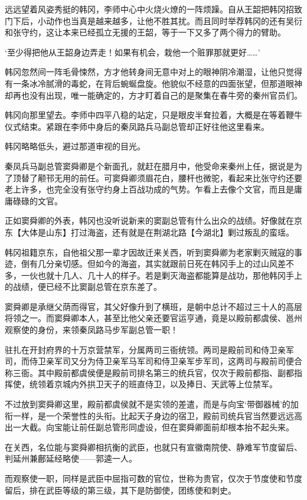 远远望着风姿秀挺的韩冈，李师中心中火烧火燎的一阵烦躁。自从王韶把韩冈招致门下后，小动作也当真是越来越多，让他不胜其扰。而且同时举荐韩冈的还有吴衍和张守约，这让本来已经孤立无援的王韶，等于一下又多了两个得力的臂助。

‘至少得把他从王韶身边弄走！如果有机会，栽他一个赃罪那就更好……’

韩冈忽然间一阵毛骨悚然，方才他转身间无意中对上的眼神阴冷潮湿，让他只觉得有一条冰冷腻滑的毒蛇，在背后蜿蜒盘旋。他貌似不经意的四面张望，但那道眼神却再也没有出现，唯一能确定的，方才盯着自己的是聚集在春牛旁的秦州官员们。

韩冈向那里望去。李师中四平八稳的站定，只是眼皮半耷拉着，大概是在等着鞭牛仪式结束。紧跟在李师中身后的秦凤路兵马副总管却正好往他这里看来。

韩冈略略低头，避过那道审视的目光。

秦凤兵马副总管窦舜卿是个新面孔，就赶在腊月中，他受命来秦州上任，据说是为了顶替了颟邗无用的前任。可窦舜卿须眉花白，腰杆也微驼，看起来比张守约还要老上许多，也完全没有张守约身上百战功成的气势。乍看上去像个文官，而且是庸庸碌碌的文官。

正如窦舜卿的外表，韩冈也没听说新来的窦副总管有什么出众的战绩。好像就在京东【大体是山东】打过海盗，还有就是在荆湖北路【今湖北】剿过叛乱的蛮瑶。

韩冈祖籍京东，自他祖父那一辈才因故迁来关西，听到窦舜卿为老家剿灭贼寇的事迹，倒有几分亲切感。但如今的海盗，其实就跟前日死在韩冈手上的过山风差不多，一伙也就十几人、几十人的样子。若是剿灭海盗都能算是战功，那他韩冈手上的战绩，便已经不比窦副总管在京东差了。

窦舜卿是承继父荫而得官，其父好像升到了横班，是朝中总计不超过三十人的高层将领之一。而窦舜卿本人，甚至比他父亲还要官运亨通，竟是以殿前都虞侯、邕州观察使的身份，来领秦凤路马步军副总管一职！

驻扎在开封府界的十万京营禁军，分属两司三衙统领。两司是殿前司和侍卫亲军司，而侍卫亲军司又分为侍卫亲军马军司和侍卫亲军步军司，这两司与殿前司便合称三衙。其中殿前都虞侯便是殿前司排名第三的统兵官，仅次于殿前都指、副都指挥使，统领着京城内外拱卫天子的班直侍卫，以及捧日、天武等上位禁军。

不过放到窦舜卿这里，殿前都虞侯就不是实领的差遣，而是与向宝‘带御器械’的加衔一样，是一个荣誉性的头衔。比起天子身边的宿卫，殿前司统兵官当然要远远高出一大截。向宝能让前任副总管形同虚设，但在窦舜卿面前却根本抬不起头来。

在关西，名位能与窦舜卿相抗衡的武臣，也就只有宣徽南院使、静难军节度留后、判延州兼鄜延经略使——郭逵一人。

而观察使一职，同样是武臣中屈指可数的官位，世称为贵官，仅次于节度使和节度留后，排在武臣等级的第三级，其下是防御使，团练使和刺史。

